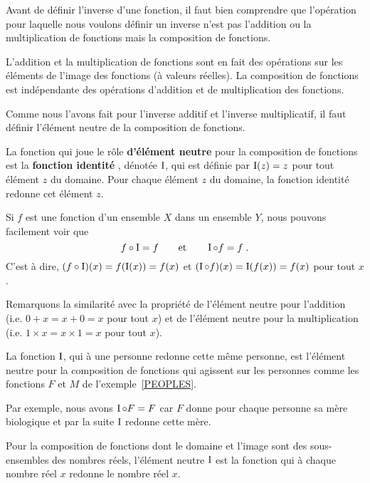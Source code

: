 {Avant de définir l'inverse d'une fonction, il faut bien comprendre que
l'opération pour laquelle nous voulons définir un inverse n'est pas
l'addition ou la multiplication de fonctions mais la composition de
fonctions.

L'addition et la multiplication de fonctions sont en fait des
opérations sur les éléments de l'image des fonctions (à valeurs
réelles).  La composition de fonctions est indépendante des opérations
d'addition et de multiplication des fonctions.

Comme nous l'avons fait pour l'inverse additif et l'inverse multiplicatif,
il faut définir l'élément neutre de la composition de fonctions.

\begin{focus}{\dfn}
La fonction qui joue le rôle {\bfseries d'élément neutre}
 pour la composition de fonctions est la
{\bfseries fonction identité} , dénotée
$\operatorname{I}$, qui est définie par $\operatorname{I}(z) = z$ pour tout élément $z$ du
domaine.  Pour chaque élément $z$ du domaine, la fonction identité
redonne cet élément $z$.
\end{focus}

Si $f$ est une fonction d'un ensemble $X$ dans un ensemble $Y$, nous
pouvons facilement voir que
\[
f \circ \operatorname{I} = f \qquad \text{et} \qquad \operatorname{I} \circ f = f \; .
\]
C'est à dire, $(f\circ \operatorname{I})(x) = f(\operatorname{I}(x)) = f(x)$ et
$(\operatorname{I}\circ f)(x) = \operatorname{I}(f(x))= f(x)$ pour tout $x$.

Remarquons la similarité avec la propriété de l'élément neutre pour
l'addition (i.e. $0 + x = x + 0 = x$ pour tout $x$) et de l'élément
neutre pour la multiplication (i.e. $1 \times x = x \times 1 = x$ pour
tout $x$).

\begin{egg}
La fonction $\operatorname{I}$, qui à une personne redonne cette même personne, est
l'élément neutre pour la composition de fonctions qui agissent sur les
personnes comme les fonctions $F$ et $M$ de l'exemple~\ref{PEOPLES}.

Par exemple, nous avons $\operatorname{I} \circ F = F$ car $F$ donne pour chaque
personne sa mère biologique et par la suite $\operatorname{I}$ redonne cette mère.
\end{egg}

\begin{egg}
Pour la composition de fonctions dont le domaine et l'image sont des
sous-ensembles des nombres réels, l'élément neutre $\operatorname{I}$ est la
fonction qui à chaque nombre réel $x$ redonne le nombre réel $x$.


\end{egg}}
